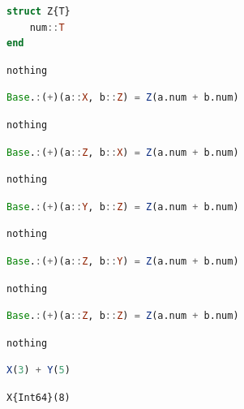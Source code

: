 \documentclass[
  notoc %
]{tufte-book}
\begin{document}
\begin{lstlisting}[language=Julia]
struct Z{T}
    num::T
end
\end{lstlisting}

\begin{lstlisting}[language=Output]
nothing
\end{lstlisting}

\begin{lstlisting}[language=Julia]
Base.:(+)(a::X, b::Z) = Z(a.num + b.num)
\end{lstlisting}

\begin{lstlisting}[language=Output]
nothing
\end{lstlisting}

\begin{lstlisting}[language=Julia]
Base.:(+)(a::Z, b::X) = Z(a.num + b.num)
\end{lstlisting}

\begin{lstlisting}[language=Output]
nothing
\end{lstlisting}

\begin{lstlisting}[language=Julia]
Base.:(+)(a::Y, b::Z) = Z(a.num + b.num)
\end{lstlisting}

\begin{lstlisting}[language=Output]
nothing
\end{lstlisting}

\begin{lstlisting}[language=Julia]
Base.:(+)(a::Z, b::Y) = Z(a.num + b.num)
\end{lstlisting}

\begin{lstlisting}[language=Output]
nothing
\end{lstlisting}

\begin{lstlisting}[language=Julia]
Base.:(+)(a::Z, b::Z) = Z(a.num + b.num)
\end{lstlisting}

\begin{lstlisting}[language=Output]
nothing
\end{lstlisting}

\begin{lstlisting}[language=Julia]
X(3) + Y(5)
\end{lstlisting}

\begin{lstlisting}[language=Output]
X{Int64}(8)
\end{lstlisting}
\end{document}
